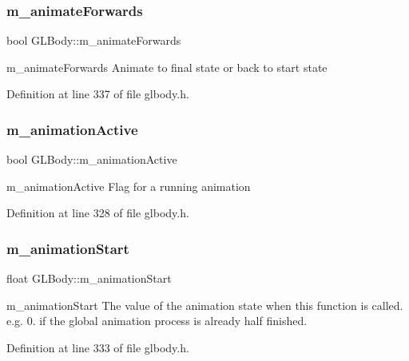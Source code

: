 \subsubsection{\texorpdfstring{m\_animateForwards}{m\_animateForwards}}
{\footnotesize\ttfamily bool G\+L\+Body\+::m\+\_\+animate\+Forwards\hspace{0.3cm}{\ttfamily [protected]}}



m\+\_\+animate\+Forwards Animate to final state or back to start state 



Definition at line 337 of file glbody.\+h.

\mbox{\label{class_g_l_body_af93b66b39a57548765d0d134db1ea35a}} 
\subsubsection{\texorpdfstring{m\_animationActive}{m\_animationActive}}
{\footnotesize\ttfamily bool G\+L\+Body\+::m\+\_\+animation\+Active\hspace{0.3cm}{\ttfamily [protected]}}



m\+\_\+animation\+Active Flag for a running animation 



Definition at line 328 of file glbody.\+h.

\mbox{\label{class_g_l_body_a504aa46f6ae7ee454f38bb96c466e561}} 
\subsubsection{\texorpdfstring{m\_animationStart}{m\_animationStart}}
{\footnotesize\ttfamily float G\+L\+Body\+::m\+\_\+animation\+Start\hspace{0.3cm}{\ttfamily [protected]}}



m\+\_\+animation\+Start The value of the animation state when this function is called. e.\+g. 0. if the global animation process is already half finished. 



Definition at line 333 of file glbody.\+h.

